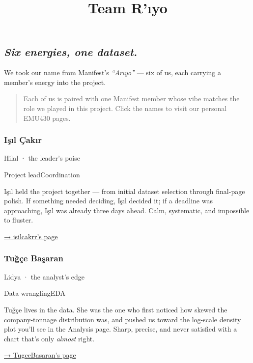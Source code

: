 \documentclass[
]{article}
\title{Team R'ıyo}
\author{}
\date{}
\begin{document}
\maketitle


\subsection{\texorpdfstring{\emph{Six energies, one
dataset.}}{Six energies, one dataset.}}\label{six-energies-one-dataset.}

We took our name from Manifest's \emph{``Arıyo''} --- six of us, each
carrying a member's energy into the project.

\begin{quote}
Each of us is paired with one Manifest member whose vibe matches the
role we played in this project. Click the names to visit our personal
EMU430 pages.
\end{quote}

\subsubsection{Işıl Çakır}\label{iux15fux131l-uxe7akux131r}

{Hilal · the leader's poise}

{Project leadCoordination}

Işıl held the project together --- from initial dataset selection
through final-page polish. If something needed deciding, Işıl decided
it; if a deadline was approaching, Işıl was already three days ahead.
Calm, systematic, and impossible to fluster.

\href{https://emu-hacettepe-analytics.github.io/emu430-spring2026-isilcakrr/}{→
isilcakrr's page}

\subsubsection{Tuğçe Başaran}\label{tuux11fuxe7e-baux15faran}

{Lidya · the analyst's edge}

{Data wranglingEDA}

Tuğçe lives in the data. She was the one who first noticed how skewed
the company-tonnage distribution was, and pushed us toward the log-scale
density plot you'll see in the Analysis page. Sharp, precise, and never
satisfied with a chart that's only \emph{almost} right.

\href{https://emu-hacettepe-analytics.github.io/emu430-spring2026-TugceBasaran/}{→
TugceBasaran's page}
\end{document}
